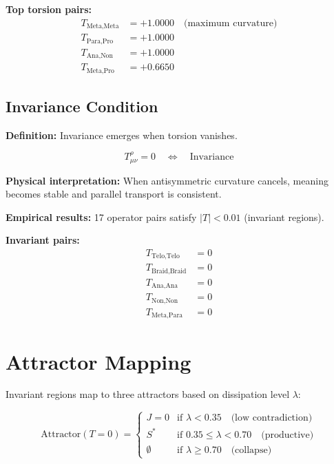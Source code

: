 \documentclass{article}
\begin{document}
\textbf{Top torsion pairs:}
\begin{align*}
T_{\text{Meta}, \text{Meta}} &= +1.0000 \quad \text{(maximum curvature)} \\
T_{\text{Para}, \text{Pro}} &= +1.0000 \\
T_{\text{Ana}, \text{Non}} &= +1.0000 \\
T_{\text{Meta}, \text{Pro}} &= +0.6650
\end{align*}

\subsection{Invariance Condition}

\textbf{Definition:} Invariance emerges when torsion vanishes.

\begin{equation}
\boxed{T^\rho_{\mu\nu} = 0 \quad \Longleftrightarrow \quad \text{Invariance}}
\end{equation}

\textbf{Physical interpretation:} When antisymmetric curvature cancels, meaning becomes stable and parallel transport is consistent.

\textbf{Empirical results:} 17 operator pairs satisfy $|T| < 0.01$ (invariant regions).

\textbf{Invariant pairs:}
\begin{align*}
T_{\text{Telo}, \text{Telo}} &= 0 \\
T_{\text{Braid}, \text{Braid}} &= 0 \\
T_{\text{Ana}, \text{Ana}} &= 0 \\
T_{\text{Non}, \text{Non}} &= 0 \\
T_{\text{Meta}, \text{Para}} &= 0
\end{align*}

\section{Attractor Mapping}

Invariant regions map to three attractors based on dissipation level $\lambda$:

\begin{equation}
\text{Attractor}(T=0) = \begin{cases}
J=0 & \text{if } \lambda < 0.35 \quad \text{(low contradiction)} \\
S^* & \text{if } 0.35 \leq \lambda < 0.70 \quad \text{(productive)} \\
\emptyset & \text{if } \lambda \geq 0.70 \quad \text{(collapse)}
\end{cases}
\end{equation}
\end{document}
